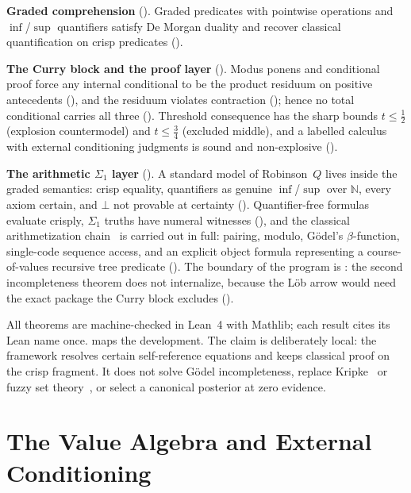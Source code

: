 \documentclass[11pt,a4paper]{article}
\newcommand{\Nat}{\mathbb{N}}
\begin{document}
\textbf{Graded comprehension} ().
Graded predicates with pointwise operations and $\inf$/$\sup$
quantifiers satisfy De Morgan duality and recover classical
quantification on crisp predicates
().

\textbf{The Curry block and the proof layer}
().
Modus ponens and conditional proof force any internal conditional to be
the product residuum on positive antecedents
(), and the residuum violates contraction
(); hence no total conditional carries all
three ().
Threshold consequence has the sharp bounds $t \leq \tfrac12$
(explosion countermodel) and $t \leq \tfrac34$ (excluded middle), and a
labelled calculus with external conditioning judgments is sound and
non-explosive
().

\textbf{The arithmetic $\Sigma_1$ layer} ().
A standard model of Robinson~$Q$ lives inside the graded semantics:
crisp equality, quantifiers as genuine $\inf$/$\sup$ over $\Nat$, every
axiom certain, and $\bot$ not provable at certainty
().
Quantifier-free formulas evaluate crisply, $\Sigma_1$ truths have
numeral witnesses (), and the classical
arithmetization chain~\cite{godel1931,fflfoundation} is carried out in
full: pairing, modulo, G\"odel's $\beta$-function, single-code sequence
access, and an explicit object formula representing a course-of-values
recursive tree predicate
().
The boundary of the program is : the second
incompleteness theorem does not internalize, because the L\"ob arrow
would need the exact package the Curry block excludes
().

All theorems are machine-checked in Lean~4 with Mathlib; each result
cites its Lean name once.
 maps the development.
The claim is deliberately local: the framework resolves certain
self-reference equations and keeps classical proof on the crisp
fragment.
It does not solve G\"odel incompleteness, replace
Kripke~\cite{kripke1975} or fuzzy set theory~\cite{takeuti1984}, or
select a canonical posterior at zero evidence.

\section{The Value Algebra and External Conditioning}
\label{sec:algebra}
\end{document}
